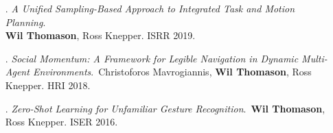 \documentclass[10pt]{article}
\makeatletter
\newcounter{cpublications}
\newcommand{\ifnonempty}[2]{\@ifnotmtarg{#1}{#2}}
\newenvironment{publication}[6][]{\setlength{\parskip}{0pt}%
	\begin{itemize}[leftmargin=0.5cm,labelindent=0pt,nolistsep]%
		\item[#2.]\emph{#3}.~{#4}. #5 #6\ifnonempty{#1}{, #1}.}{\end{itemize}}
\newenvironment{confpub}[5][]{\addtocounter{cpublicationsTot}{1}\addtocounter{cpublications}{-1}
	\begin{publication}[#1]{\thecpublications}{#2}{#3}{#4}{#5}\end{publication}}{}
\makeatother
\begin{document}
\begin{confpub}{A Unified Sampling-Based Approach to Integrated Task and Motion
		Planning}{\\\textbf{Wil Thomason}, Ross Knepper}{ISRR}{2019}
\end{confpub}

\begin{confpub}{Social Momentum: A Framework for Legible Navigation in Dynamic Multi-Agent
		Environments}{Christoforos Mavrogiannis, \textbf{Wil Thomason}, Ross Knepper}{HRI}{2018}
\end{confpub}

\begin{confpub}{Zero-Shot Learning for Unfamiliar Gesture Recognition}{\textbf{Wil Thomason}, Ross
		Knepper}{ISER}{2016}
\end{confpub}
\end{document}
